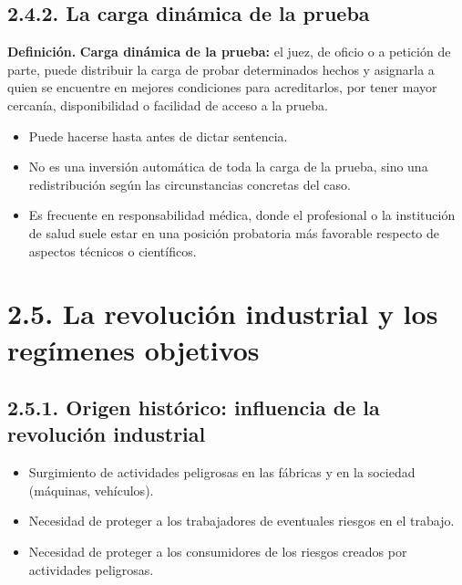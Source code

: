 \subsection{2.4.2. La carga dinámica de la prueba}
\begin{definicion}
\textcolor[HTML]{1F3864}{\textbf{Definición. }}\textbf{Carga dinámica de la prueba: }el juez, de oficio o a petición de parte, puede distribuir la carga de probar determinados hechos y asignarla a quien se encuentre en mejores condiciones para acreditarlos, por tener mayor cercanía, disponibilidad o facilidad de acceso a la prueba.
\end{definicion}
\begin{itemize}
\item Puede hacerse hasta antes de dictar sentencia.
\item No es una inversión automática de toda la carga de la prueba, sino una redistribución según las circunstancias concretas del caso.
\item Es frecuente en responsabilidad médica, donde el profesional o la institución de salud suele estar en una posición probatoria más favorable respecto de aspectos técnicos o científicos.
\end{itemize}
\section{2.5. La revolución industrial y los regímenes objetivos}
\subsection{2.5.1. Origen histórico: influencia de la revolución industrial}
\begin{itemize}
\item Surgimiento de actividades peligrosas en las fábricas y en la sociedad (máquinas, vehículos).
\item Necesidad de proteger a los trabajadores de eventuales riesgos en el trabajo.
\item Necesidad de proteger a los consumidores de los riesgos creados por actividades peligrosas.
\end{itemize}
